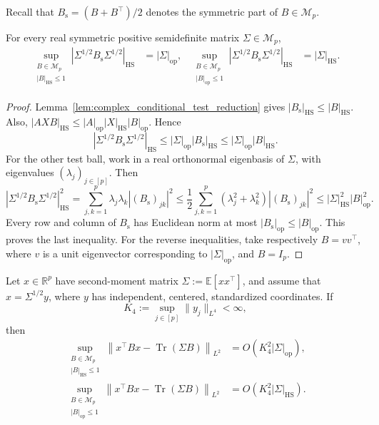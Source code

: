 \documentclass[EJP, preprint, NODS, nobera, nofontexpansion]{ejpecp}
\DeclareMathOperator{\op}{op}
\DeclareMathOperator{\tr}{Tr}
\DeclareMathOperator{\hs}{HS}
\begin{document}
Recall that $B_{\mathrm s}=(B+B^{\top})/2$ denotes the symmetric part of
$B\in\mathcal M_p$.

\begin{lemma}
\label{lem:quadratic_form_test_ball_geometry}
For every real symmetric positive semidefinite matrix
$\Sigma\in\mathcal M_p$,
\begin{align*}
    \sup_{\substack{B\in\mathcal M_p\\|B|_{\hs}\leq1}}
    |\Sigma^{1/2}B_{\mathrm s}\Sigma^{1/2}|_{\hs}
    &=|\Sigma|_{\op},
    &
    \sup_{\substack{B\in\mathcal M_p\\|B|_{\op}\leq1}}
    |\Sigma^{1/2}B_{\mathrm s}\Sigma^{1/2}|_{\hs}
    &=|\Sigma|_{\hs}.
\end{align*}
\end{lemma}

\begin{proof}
Lemma~\ref{lem:complex_conditional_test_reduction} gives
$|B_{\mathrm s}|_{\hs}\leq |B|_{\hs}$.  Also,
$|AXB|_{\hs}\leq |A|_{\op}|X|_{\hs}|B|_{\op}$.  Hence
\[
    |\Sigma^{1/2}B_{\mathrm s}\Sigma^{1/2}|_{\hs}
    \leq |\Sigma|_{\op}|B_{\mathrm s}|_{\hs}
    \leq |\Sigma|_{\op}|B|_{\hs}.
\]
For the other test ball, work in a real orthonormal eigenbasis of
\(\Sigma\), with eigenvalues \((\lambda_j)_{j\in[p]}\). Then
\[
    |\Sigma^{1/2}B_{\mathrm s}\Sigma^{1/2}|_{\hs}^2
    =\sum_{j,k=1}^p
      \lambda_j\lambda_k|(B_{\mathrm s})_{jk}|^2
    \leq\frac12\sum_{j,k=1}^p
      (\lambda_j^2+\lambda_k^2)|(B_{\mathrm s})_{jk}|^2
    \leq |\Sigma|_{\hs}^2|B|_{\op}^2.
\]
Every row and column of $B_{\mathrm s}$ has Euclidean norm at most
$|B_{\mathrm s}|_{\op}\leq|B|_{\op}$.  This proves the last inequality.
For the reverse inequalities, take respectively
$B=vv^{\top}$, where $v$ is a unit eigenvector corresponding to
$|\Sigma|_{\op}$, and $B=I_p$.
\end{proof}



\begin{lemma}
\label{lem:profile_quadratic_form_moduli}
Let $x\in\mathbb R^p$ have second-moment matrix
$\Sigma:=\mathbb E[xx^\top]$, and assume that $x=\Sigma^{1/2}y$,
where $y$ has independent, centered, standardized coordinates.
If
\[
    K_4:=\sup_{j\in[p]}\|y_j\|_{L^4}<\infty,
\]
then
\begin{align*}
    \sup_{\substack{B\in\mathcal M_p\\|B|_{\hs}\leq1}}
    \left\|x^\top Bx-\tr(\Sigma B)\right\|_{L^2}
    &=O\!\left(K_4^2|\Sigma|_{\op}\right),
    \\
    \sup_{\substack{B\in\mathcal M_p\\|B|_{\op}\leq1}}
    \left\|x^\top Bx-\tr(\Sigma B)\right\|_{L^2}
    &=O\!\left(K_4^2|\Sigma|_{\hs}\right).
\end{align*}
\end{lemma}
\end{document}
